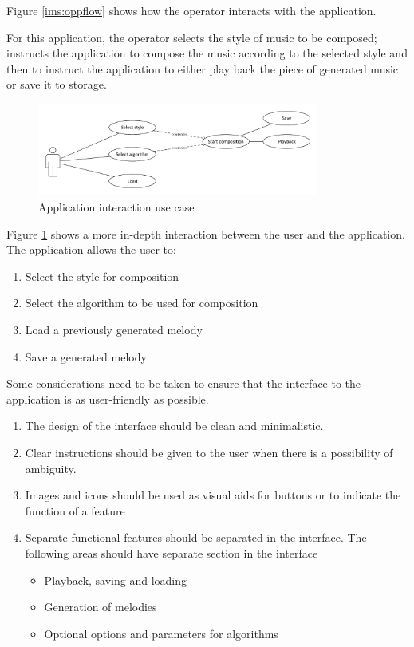Figure \ref{ims:oppflow} shows how the operator interacts with the application. 

For this application, the operator selects the style of music to be composed; instructs the application to compose the music according to the selected style and then to instruct the application to either play back the piece of generated music or save it to storage.

\begin{figure}
\centerline{\includegraphics[width=350px]{../images/op_use_case.pdf}}
\caption{Application interaction use case}
\label{ims:opusecase}
\end{figure}

Figure \ref{ims:opusecase} shows a more in-depth interaction between the user and the application. 
The application allows the user to:
\begin{enumerate}
\item Select the style for composition
\item Select the algorithm to be used for composition
\item Load a previously generated melody
\item Save a generated melody
\end{enumerate}

Some considerations need to be taken to ensure that the interface to the application is as user-friendly as possible. 

\begin{enumerate}
\item The design of the interface should be clean and minimalistic. 
\item Clear instructions should be given to the user when there is a possibility of ambiguity.
\item Images and icons should be used as visual aids for buttons or to indicate the function of a feature
\item Separate functional features should be separated in the interface. The following areas should have separate section in the interface
	\begin{itemize}
	\item Playback, saving and loading
	\item Generation of melodies
	\item Optional options and parameters for algorithms
	\end{itemize} 
\end{enumerate}

